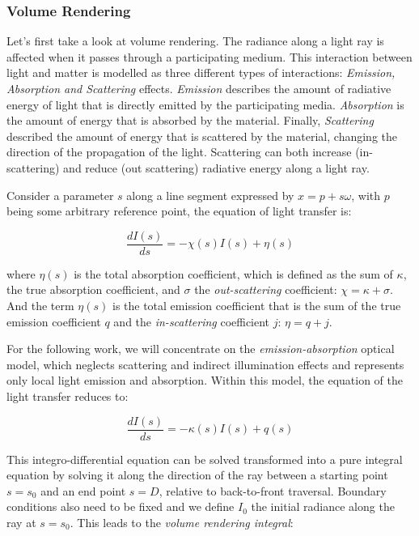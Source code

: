 \subsubsection{Volume Rendering}
Let's first take a look at volume rendering. The radiance along a light ray is affected when it passes through a participating medium. This interaction between light and matter is modelled as three different types of interactions: \textit{Emission, Absorption and Scattering} effects. \textit{Emission} describes the amount of radiative energy of light that is directly emitted by the participating media. \textit{Absorption} is the amount of energy that is absorbed by the material. Finally, \textit{Scattering} described the amount of energy that is scattered by the material, changing the direction of the propagation of the light. Scattering can both increase (in-scattering) and reduce (out scattering) radiative energy along a light ray.

Consider a parameter $s$ along a line segment expressed by $x=p+s\omega$, with $p$ being some arbitrary reference point, the equation of light transfer is:

\begin{equation*}
	\frac{dI(s)}{ds}=-\chi (s)I(s)+\eta (s)
\end{equation*}

where $\eta (s)$ is the total absorption coefficient, which is defined as the sum of $\kappa$, the true absorption coefficient, and $\sigma$ the \textit{out-scattering} coefficient: $\chi=\kappa+\sigma$. And the term $\eta(s)$ is the total emission coefficient that is the sum of the true emission coefficient $q$ and the \textit{in-scattering} coefficient $j$: $\eta=q+j$.

For the following work, we will concentrate on the \textit{emission-absorption} optical model, which neglects scattering and indirect illumination effects and represents only local light emission and absorption. Within this model, the equation of the light transfer reduces to:

\begin{equation*}
	\frac{dI(s)}{ds}=-\kappa (s)I(s)+q(s)
\end{equation*}

This integro-differential equation can be solved transformed into a pure integral equation by solving it along the direction of the ray between a starting point $s=s_0$ and an end point $s=D$, relative to back-to-front traversal. Boundary conditions also need to be fixed and we define $I_0$ the initial radiance along the ray at $s=s_0$. This leads to the \textit{volume rendering integral}\cite{b:Real-timeVolumeGraphics}:

